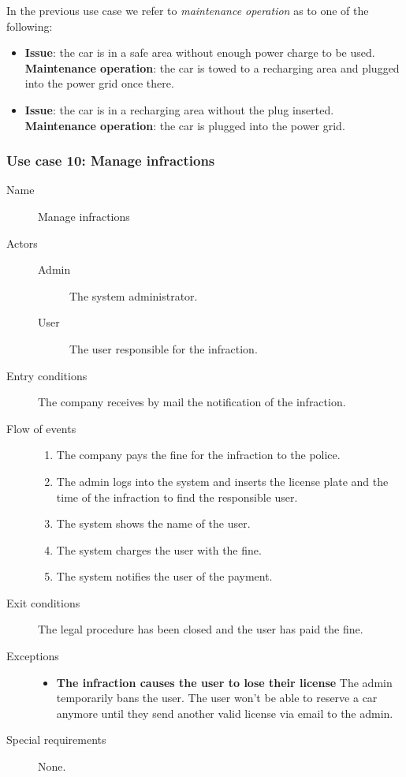 		In the previous use case we refer to \textit{maintenance operation} as to one of the following:
		\begin{itemize}
			\item \textbf{Issue}: the car is in a safe area without enough power charge to be used. \textbf{Maintenance operation}: the car is towed to a recharging area and plugged into the power grid once there.
			\item \textbf{Issue}: the car is in a recharging area without the plug inserted. \textbf{Maintenance operation}: the car is plugged into the power grid.
		\end{itemize}
	

	\subsubsection{Use case 10: Manage infractions}
		\begin{description}
			\item[Name] Manage infractions
			\item[Actors] \hfill
				\begin{description}
					\item[Admin] The system administrator.
					\item[User] The user responsible for the infraction.
				\end{description}
			\item[Entry conditions] The company receives by mail the notification of the infraction.
			\item[Flow of events] \hfill
				\begin{enumerate}
					\item The company pays the fine for the infraction to the police.
					\item The admin logs into the system and inserts the license plate and the time of the infraction to find the responsible user.
					\item The system shows the name of the user.
					\item The system charges the user with the fine.
					\item The system notifies the user of the payment.
				\end{enumerate}
			\item[Exit conditions] The legal procedure has been closed and the user has paid the fine.
			\item[Exceptions] \hfill
				\begin{itemize}
					\item \textbf{The infraction causes the user to lose their license} The admin temporarily bans the user. The user won't be able to reserve a car anymore until they send another valid license via email to the admin.
				\end{itemize}
			\item[Special requirements] None.
		\end{description}

